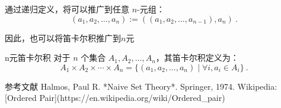 通过递归定义，将可以推广到任意 \(n\)-元组：
\begin{equation}
(a_1, a_2, \ldots, a_n) := ((a_1, a_2, \ldots, a_{n-1}), a_n)~.
\end{equation}

因此，也可以将笛卡尔积推广到$n$元
\begin{definition}{n元笛卡尔积}
对于 $n$ 个集合 $A_1, A_2, \ldots, A_n$，其笛卡尔积定义为：
\begin{equation}
A_1 \times A_2 \times \cdots \times A_n = \{(a_1, a_2, \ldots, a_n) \mid \forall i,a_i \in A_i \} ~.
\end{equation}
\end{definition}

参考文献
Halmos, Paul R. *Naive Set Theory*. Springer, 1974.
Wikipedia: [Ordered Pair](https://en.wikipedia.org/wiki/Ordered_pair)